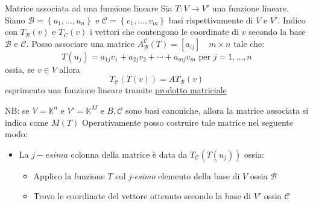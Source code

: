 \begin{definizione}{Matrice associata ad una funzione lineare}
	Sia $ T : V \to V'$ una funzione lineare. Siano $  \mathcal{B} = \left\{ u_1,\ldots,u_n \right\}  $ e $ \mathcal{C} = \left\{ v_1,\ldots,v_m \right\}  $ basi rispettivamente di $ V $ e $ V' $.
	\vskip3mm
	Indico con $ T_\mathcal{B}\left( v \right)  $ e $ T_C\left( v \right)  $ i vettori che contengono le coordinate di $ v $ secondo la base $ \mathcal{B} $ e $ \mathcal{C} $.
	\vskip3mm
	Posso associare una matrice $ A_\mathcal{B}^\mathcal{C}\left( T \right)  = \left[ a_{ij} \right]  \quad m \times n	$ tale che:
	\[
		T\left(u_j\right)=a_{1 j} v_1+a_{2 j} v_2+\cdots+a_{m j} v_m \text{ per } j=1, \ldots, n
	\]
	ossia, se $ v \in V $ allora
	\[
		T_\mathcal{C} \left( T\left( v \right) \right)  = AT_\mathcal{B}\left( v \right)
	\]
	esprimento una funzione lineare tramite \underline{prodotto matriciale}
\end{definizione}
\label{Matrice associata}
NB: se $ V = \mathbb{K}^{n} $ e $ V' = \mathbb{K}^{M} $ e $ B,\mathcal{C} $ sono basi canoniche, allora la matrice associata si indica come $ M\left( T \right)  $
\vskip3mm
Operativamente posso costruire tale matrice nel seguente modo:
\begin{itemize}
	\item La $ j-esima $ colonna della matrice è data da $ T_\mathcal{C}\left( T\left( u_j \right)  \right)  $ ossia:
	      \begin{itemize}
		      \item Applico la funzione $ T $ sul \textit{j-esimo} elemento della base di $ V $ ossia $ \mathcal{B} $
		      \item Trovo le coordinate del vettore ottenuto secondo la base di $ V' $ ossia $ \mathcal{C} $
	      \end{itemize}
\end{itemize}
